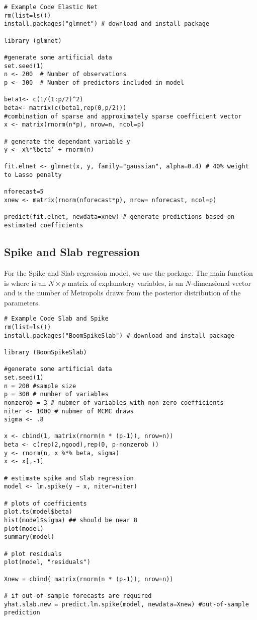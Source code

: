 \documentclass[12pt]{article}
\begin{document}
\begin{lstlisting}[title=\textbf{Elastic Net regression.}]
# Example Code Elastic Net
rm(list=ls())
install.packages("glmnet") # download and install package

library (glmnet)

#generate some artificial data
set.seed(1)
n <- 200  # Number of observations
p <- 300  # Number of predictors included in model

beta1<- c(1/(1:p/2)^2)
beta<- matrix(c(beta1,rep(0,p/2)))
#combination of sparse and approximately sparse coefficient vector
x <- matrix(rnorm(n*p), nrow=n, ncol=p)

# generate the dependant variable y
y <- x%*%beta’ + rnorm(n)

fit.elnet <- glmnet(x, y, family="gaussian", alpha=0.4) # 40% weight to Lasso penalty

nforecast=5
xnew <- matrix(rnorm(nforecast*p), nrow= nforecast, ncol=p)

predict(fit.elnet, newdata=xnew) # generate predictions based on estimated coefficients
\end{lstlisting}

\subsection{Spike and Slab regression \textendash{} {\href{https://github.com/eurostat/econowcast/blob/master/model/SpikeSlab.R}{}}}

For the Spike and Slab regression model, we use the  package. 
The main function is  where  is an $N \times p$ matrix of explanatory variables,  is an $N$-dimensional vector and  is the number of Metropolis draws from the posterior distribution of the parameters.

\begin{lstlisting}[title=\textbf{Slab and Spike regression.}]
# Example Code Slab and Spike
rm(list=ls())
install.packages("BoomSpikeSlab") # download and install package

library (BoomSpikeSlab)

#generate some artificial data
set.seed(1)
n = 200 #sample size
p = 300 # number of variables
nonzerob = 3 # nubmer of variables with non-zero coefficients
niter <- 1000 # nubmer of MCMC draws
sigma <- .8

x <- cbind(1, matrix(rnorm(n * (p-1)), nrow=n))
beta <- c(rep(2,ngood),rep(0, p-nonzerob ))
y <- rnorm(n, x %*% beta, sigma)
x <- x[,-1]

# estimate spike and Slab regression
model <- lm.spike(y ~ x, niter=niter)

# plots of coefficients
plot.ts(model$beta)
hist(model$sigma) ## should be near 8
plot(model)
summary(model)

# plot residuals
plot(model, "residuals")

Xnew = cbind( matrix(rnorm(n * (p-1)), nrow=n))

# if out-of-sample forecasts are required
yhat.slab.new = predict.lm.spike(model, newdata=Xnew) #out-of-sample prediction
\end{lstlisting}
\end{document}
